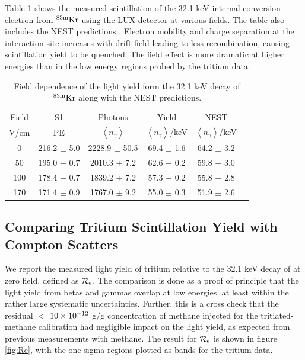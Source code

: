 Table \ref{table:kr32} shows the measured scintillation of the 32.1 keV internal conversion electron from $\rm ^{83m}Kr$ using the LUX detector at various fields. The table also includes the NEST predictions \cite{NEST_2013}. Electron mobility and charge separation at the interaction site increases with drift field leading to less recombination, causing scintillation yield to be quenched. The field effect is more dramatic at higher energies than in the low energy regions probed by the tritium data.

\renewcommand{\baselinestretch}{1}
\small\normalsize
\begin{table}[h!]
\begin{center}
\begin{tabular}{|c|c|c|c|c|c|}
\hline
Field	&S1			& Photons						& Yield 								&NEST	 \\
V/cm	& PE					& $\left<n_{\gamma}\right>$		& $\left<n_{\gamma}\right>$/keV	& $\left<n_{\gamma}\right>$/keV \\ \hline
0 		&	216.2 $\pm$ 5.0 	&2228.9 $\pm$ 50.5 &	69.4 $\pm$	1.6 	&	64.2 $\pm$ 3.2  \\ \hline
50 		&	195.0 $\pm$ 0.7 	&2010.3 $\pm$ 7.2   & 	62.6 $\pm$	0.2	&	59.8 $\pm$ 3.0 \\ \hline
100 	&	178.4 $\pm$ 0.7 	&1839.2 $\pm$ 	7.2	 &	57.3 $\pm$ 0.2 	&	55.8 $\pm$ 2.8 \\ \hline
170 	&  171.4 $\pm$ 0.9		&1767.0 $\pm$ 	9.2  &	55.0 $\pm$ 0.3 	&	51.9 $\pm$ 2.6 \\ \hline
\end{tabular}
\caption{Field dependence of the light yield form the 32.1 keV decay of $\rm^{83m}Kr$ along with the NEST \cite{NEST_2013} predictions.}
\label{table:kr32}
\end{center}
\end{table}
\renewcommand{\baselinestretch}{2}
\small\normalsize


\subsection{Comparing Tritium Scintillation Yield with Compton Scatters}

We report the measured light yield of tritium relative to the 32.1 keV decay of \KrCal at zero field, defined as $\rm \mathcal{R}_e$. The comparison is done as a proof of principle that the light yield from betas and gammas overlap at low energies, at least within the rather large systematic uncertainties. Further, this is a cross check that the residual $<$ $\rm10\times10^{-12}$ g/g concentration of methane injected for the tritiated-methane calibration had negligible impact on the light yield, as expected from previous measurements with methane\cite{Kirill_Methane}. The result for $\rm \mathcal{R}_e$ is shown in figure \ref{fig:Re}, with the one sigma regions plotted as bands for the tritium data.


